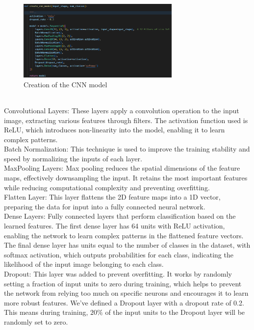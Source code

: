 \documentclass{article}
\begin{document}
\begin{figure}[H]
\caption{Creation of the CNN model}
\centering
\includegraphics[width=8cm]{imgFolder/create_cnn_model.png}
\end{figure}
\text{ }\\
Convolutional Layers: These layers apply a convolution operation to the input image,
extracting various features through filters.
The activation function used is ReLU,
which introduces non-linearity into the model, enabling it to learn complex patterns.\\\newline
Batch Normalization: This technique is used to improve the training stability and speed
by normalizing the inputs of each layer.\\\newline
MaxPooling Layers: Max pooling reduces the spatial dimensions of the feature maps,
effectively downsampling the input.
It retains the most important features while reducing computational
complexity and preventing overfitting.\\\newline
Flatten Layer: This layer flattens the 2D feature maps into a 1D vector,
preparing the data for input into a fully connected neural network.\\\newline
Dense Layers: Fully connected layers that perform classification based on the learned features.
The first dense layer has 64 units with ReLU activation, enabling the network to learn complex
patterns in the flattened feature vectors.
The final dense layer has units equal to the number of classes
in the dataset, with softmax activation, which outputs probabilities for each class,
indicating the likelihood of the input image belonging to each class.\\\newline
Dropout: This layer was added to prevent overfitting.
It works by randomly setting a fraction of input units to zero during training,
which helps to prevent the network from relying too much on specific neurons
and encourages it to learn more robust features.
We've defined a Dropout layer with a dropout rate of 0.2.
This means during training, ${20\%}$ of the input units to the Dropout layer will be randomly set to zero.\\\newline
\end{document}
